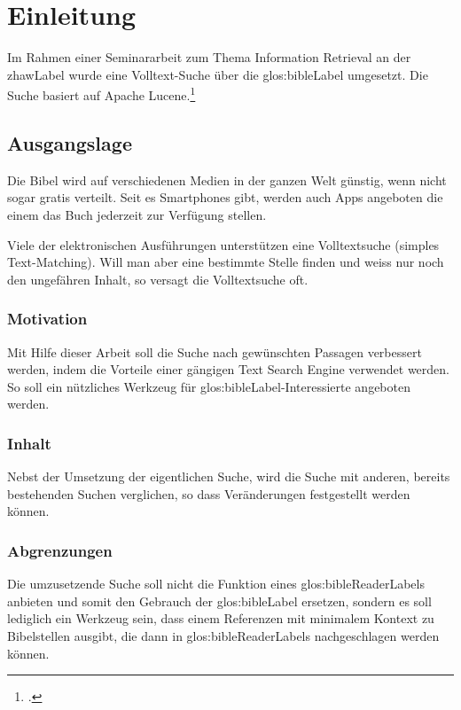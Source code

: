 
\chapter{Einleitung}
Im Rahmen einer Seminararbeit zum Thema Information Retrieval an der \gls{zhawLabel} wurde eine Volltext-Suche über die \gls{glos:bibleLabel} umgesetzt. Die Suche basiert auf Apache Lucene.\footcite{Apache_Lucene_2016-05-07}

\section{Ausgangslage}
Die Bibel wird auf verschiedenen Medien in der ganzen Welt günstig, wenn nicht sogar gratis verteilt.
Seit es Smartphones gibt, werden auch Apps angeboten die einem das Buch jederzeit zur Verfügung stellen.

Viele der elektronischen Ausführungen unterstützen eine Volltextsuche (simples Text-Matching).
Will man aber eine bestimmte Stelle finden und weiss nur noch den ungefähren Inhalt, so versagt die Volltextsuche oft.

\subsection{Motivation}
Mit Hilfe dieser Arbeit soll die Suche nach gewünschten Passagen verbessert werden, indem die Vorteile einer gängigen Text Search Engine verwendet werden.
So soll ein nützliches Werkzeug für \gls{glos:bibleLabel}-Interessierte angeboten werden.

\subsection{Inhalt}
Nebst der Umsetzung der eigentlichen Suche, wird die Suche mit anderen, bereits bestehenden Suchen verglichen, so dass Veränderungen festgestellt werden können.

\subsection{Abgrenzungen}
Die umzusetzende Suche soll nicht die Funktion eines \gls{glos:bibleReaderLabel}s anbieten und somit den Gebrauch der \gls{glos:bibleLabel} ersetzen, sondern es soll lediglich ein Werkzeug sein, dass einem Referenzen mit minimalem Kontext zu Bibelstellen ausgibt, die dann in \glspl{glos:bibleReaderLabel} nachgeschlagen werden können.

